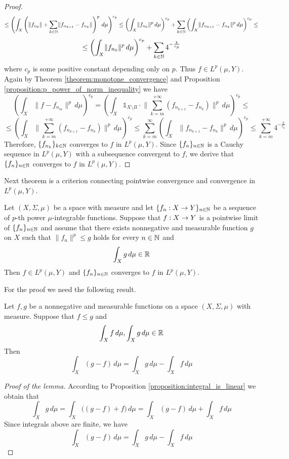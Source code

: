\documentclass[10pt]{amsart}
\begin{document}
\begin{proof}
	$$\leq \left(\int_X\left(\lVert f_{n_0}\rVert  + \sum_{k\in {\mathbb N}}\lVert f_{n_{k+1}}-f_{n_k}\rVert \right)^p\,d\mu\right)^{c_p} \leq \left(\int_X\lVert f_{n_0}\rVert^p \,d\mu\right)^{c_p} + \sum_{k\in {\mathbb N}}\left(\int_X \lVert f_{n_{k+1}}-f_{n_k}\rVert^p \,d\mu\right)^{c_p} \leq$$
$$\leq \left(\int_X\lVert f_{n_0}\rVert^p \,d\mu\right)^{c_p} + \sum_{k\in {\mathbb N}}4^{-\frac{k}{c_p}}$$
	where $c_p$ is some positive constant depending only on $p$. Thus $f\in L^p(\mu,Y)$. Again by Theorem \ref{theorem:monotone_convergence} and Proposition
	\ref{proposition:p_power_of_norm_inequality} we have
	$$\left(\int_X\lVert f - f_{n_m}\rVert^p\,d\mu\right)^{c_p} = \left(\int_X\mathbb{1}_{X\setminus B}\cdot \big\lVert \sum_{k = m}^{+\infty}\left(f_{n_{k+1}} - f_{n_k}\right)\big\rVert^p \,d\mu\right)^{c_p} \leq  $$
	$$\leq \left(\int_X \big\lVert \sum_{k=m}^{+\infty}\left(f_{n_{k+1}} - f_{n_k}\right)\big\rVert^p \,d\mu \right)^{c_p}\leq \sum_{k=m}^{\infty}\left(\int_X\lVert f_{n_{k+1}} - f_{n_k}\rVert^p \,d\mu\right)^{c_p} \leq \sum_{k=m}^{+\infty}4^{-\frac{k}{c_p}}$$
	Therefore, $\{f_{n_k}\}_{k\in {\mathbb N}}$ converges to $f$ in $L^p(\mu,Y)$. Since $\{f_n\}_{n\in {\mathbb N}}$ is a Cauchy sequence in $L^p(\mu,Y)$ with a subsequence convergent to $f$, we derive that $\{f_n\}_{n\in {\mathbb N}}$ converges to $f$ in $L^p(\mu,Y)$.
\end{proof}
\noindent
Next theorem is a criterion connecting pointwise convergence and convergence in $L^p(\mu,Y)$.

\begin{theorem}\label{theorem:dominated_convergence}
	Let $(X,\Sigma,\mu)$ be a space with measure and let $\{f_n:X\rightarrow Y\}_{n\in {\mathbb N}}$ be a sequence of $p$-th power $\mu$-integrable functions. Suppose that $f:X\rightarrow Y$ is a pointwise limit of $\{f_n\}_{n\in {\mathbb N}}$ and assume that there exists nonnegative and measurable function $g$ on $X$ such that $\lVert f_n\rVert^p \leq g$ holds for every $n\in {\mathbb N}$ and
	$$\int_X g\,d\mu\in {\mathbb R}$$
	Then $f\in L^p(\mu,Y)$ and $\{f_n\}_{n\in {\mathbb N}}$ converges to $f$ in $L^p(\mu,Y)$.
\end{theorem}
For the proof we need the following result.

\begin{lemma}\label{lemma:difference_of_integrals}
	Let $f, g$ be a nonnegative and measurable functions on a space $(X,\Sigma,\mu)$ with measure. Suppose that $f \leq g$ and
	$$\int_Xf\,d\mu, \int_Xg\,d\mu\in {\mathbb R}$$
	Then
	$$\int_X(g-f)\,d\mu = \int_Xg\,d\mu - \int_Xf\,d\mu$$
\end{lemma}
\begin{proof}[Proof of the lemma]
	According to Proposition \ref{proposition:integral_is_linear} we obtain that
	$$\int_Xg\,d\mu = \int_X\big((g-f) + f\big)\,d\mu = \int_X(g-f)\,d\mu + \int_Xf\,d\mu$$
	Since integrals above are finite, we have
	$$\int_X(g-f)\,d\mu = \int_Xg\,d\mu - \int_Xf\,d\mu$$
\end{proof}
\end{document}
